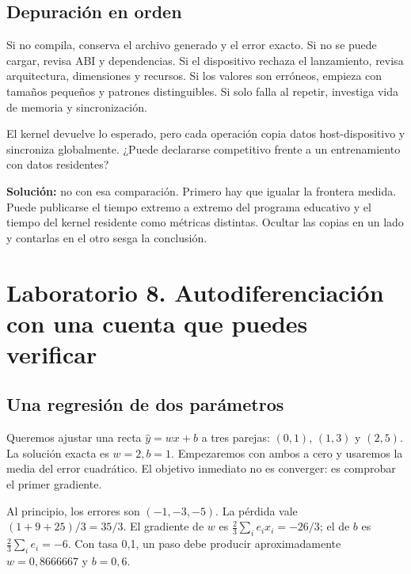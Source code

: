 \documentclass[12pt,a4paper,oneside]{report}
\begin{document}
\section{Depuración en orden}
Si no compila, conserva el archivo generado y el error exacto. Si no se puede cargar, revisa ABI y dependencias. Si el dispositivo rechaza el lanzamiento, revisa arquitectura, dimensiones y recursos. Si los valores son erróneos, empieza con tamaños pequeños y patrones distinguibles. Si solo falla al repetir, investiga vida de memoria y sincronización.

\begin{practica}
El kernel devuelve lo esperado, pero cada operación copia datos host-dispositivo y sincroniza globalmente. ¿Puede declararse competitivo frente a un entrenamiento con datos residentes?

\textbf{Solución:} no con esa comparación. Primero hay que igualar la frontera medida. Puede publicarse el tiempo extremo a extremo del programa educativo y el tiempo del kernel residente como métricas distintas. Ocultar las copias en un lado y contarlas en el otro sesga la conclusión.

\end{practica}
\chapter{Laboratorio 8. Autodiferenciación con una cuenta que puedes verificar}
\label{lab:ocho}
\section{Una regresión de dos parámetros}
Queremos ajustar una recta $\hat y=wx+b$ a tres parejas: $(0,1)$, $(1,3)$ y $(2,5)$. La solución exacta es $w=2,b=1$. Empezaremos con ambos a cero y usaremos la media del error cuadrático. El objetivo inmediato no es converger: es comprobar el primer gradiente.

Al principio, los errores son $(-1,-3,-5)$. La pérdida vale $(1+9+25)/3=35/3$. El gradiente de $w$ es $\frac23\sum_i e_ix_i=-26/3$; el de $b$ es $\frac23\sum_i e_i=-6$. Con tasa 0,1, un paso debe producir aproximadamente $w=0,8666667$ y $b=0,6$.
\end{document}
